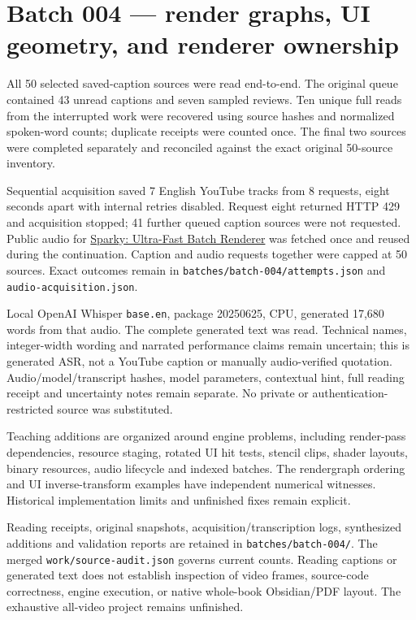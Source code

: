 \section{Batch 004 --- render graphs, UI geometry, and renderer ownership}\label{appendix-877738f6f4d2-batch-004-render-graphs-ui-geometry-and-renderer-ownership}

All 50 selected saved-caption sources were read end-to-end. The original queue contained 43 unread captions and seven sampled reviews. Ten unique full reads from the interrupted work were recovered using source hashes and normalized spoken-word counts; duplicate receipts were counted once. The final two sources were completed separately and reconciled against the exact original 50-source inventory.

Sequential acquisition saved 7 English YouTube tracks from 8 requests, eight seconds apart with internal retries disabled. Request eight returned HTTP 429 and acquisition stopped; 41 further queued caption sources were not requested. Public audio for \href{https://www.youtube.com/watch?v=ImtWD_9OAeY}{Sparky: Ultra-Fast Batch Renderer} was fetched once and reused during the continuation. Caption and audio requests together were capped at 50 sources. Exact outcomes remain in \texttt{batches/batch-004/attempts.json} and \texttt{audio-acquisition.json}.

Local OpenAI Whisper \texttt{base.en}, package 20250625, CPU, generated 17,680 words from that audio. The complete generated text was read. Technical names, integer-width wording and narrated performance claims remain uncertain; this is generated ASR, not a YouTube caption or manually audio-verified quotation. Audio/model/transcript hashes, model parameters, contextual hint, full reading receipt and uncertainty notes remain separate. No private or authentication-restricted source was substituted.

Teaching additions are organized around engine problems, including render-pass dependencies, resource staging, rotated UI hit tests, stencil clips, shader layouts, binary resources, audio lifecycle and indexed batches. The rendergraph ordering and UI inverse-transform examples have independent numerical witnesses. Historical implementation limits and unfinished fixes remain explicit.

Reading receipts, original snapshots, acquisition/transcription logs, synthesized additions and validation reports are retained in \texttt{batches/batch-004/}. The merged \texttt{work/source-audit.json} governs current counts. Reading captions or generated text does not establish inspection of video frames, source-code correctness, engine execution, or native whole-book Obsidian/PDF layout. The exhaustive all-video project remains unfinished.

